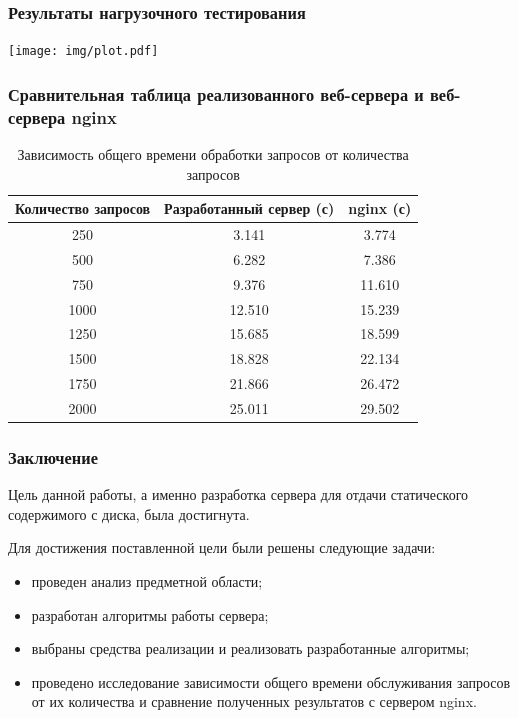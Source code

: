 \documentclass[gray]{beamer}
\begin{document}
\begin{frame}
    \frametitle{Результаты нагрузочного тестирования}
    \centering
    \texttt{[image: img/plot.pdf]}
\end{frame}

\begin{frame}
    \frametitle{Сравнительная таблица реализованного веб-сервера и веб-сервера nginx}
    \centering

    \begin{table}[H]
        \centering
        \caption{Зависимость общего времени обработки запросов от количества запросов}
        \label{tab:table}
        \begin{tabular}{|c|c|c|}
            \hline
            \textbf{Количество запросов} & \textbf{Разработанный сервер (с)} & \textbf{nginx (с)} \\ \hline
            250                          & 3.141                 & 3.774              \\ \hline
            500                          & 6.282                 & 7.386              \\ \hline
            750                          & 9.376                 & 11.610             \\ \hline
            1000                         & 12.510                & 15.239             \\ \hline
            1250                         & 15.685                & 18.599             \\ \hline
            1500                         & 18.828                & 22.134             \\ \hline
            1750                         & 21.866                & 26.472             \\ \hline
            2000                         & 25.011                & 29.502             \\ \hline
        \end{tabular}
    \end{table}
\end{frame}

\begin{frame}
    \frametitle{Заключение}
Цель данной работы, а именно разработка сервера для отдачи статического содержимого с диска, была достигнута.

Для достижения поставленной цели были решены следующие задачи:
\begin{itemize}
    \item проведен анализ предметной области;
    \item разработан алгоритмы работы сервера;
    \item выбраны средства реализации и реализовать разработанные алгоритмы;
    \item проведено исследование зависимости общего времени обслуживания запросов от их количества и сравнение полученных результатов с сервером nginx.
\end{itemize}
\end{frame}
\end{document}
